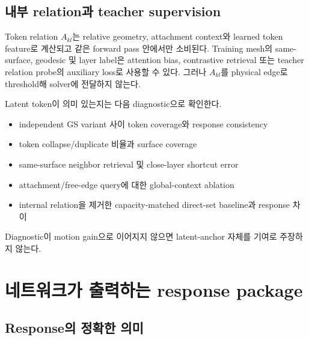\documentclass[11pt]{article}
\begin{document}
\subsection{내부 relation과 teacher supervision}

Token relation \(A_{kl}\)는 relative geometry, attachment context와 learned token feature로 계산되고
같은 forward pass 안에서만 소비된다.
Training mesh의 same-surface, geodesic 및 layer label은 attention bias, contrastive retrieval 또는
teacher relation probe의 auxiliary loss로 사용할 수 있다. 그러나 \(A_{kl}\)를 physical edge로 threshold해
solver에 전달하지 않는다.

Latent token이 의미 있는지는 다음 diagnostic으로 확인한다.
\begin{itemize}
  \item independent GS variant 사이 token coverage와 response consistency
  \item token collapse/duplicate 비율과 surface coverage
  \item same-surface neighbor retrieval 및 close-layer shortcut error
  \item attachment/free-edge query에 대한 global-context ablation
  \item internal relation을 제거한 capacity-matched direct-set baseline과 response 차이
\end{itemize}
Diagnostic이 motion gain으로 이어지지 않으면 latent-anchor 자체를 기여로 주장하지 않는다.

\section{네트워크가 출력하는 response package}

\subsection{Response의 정확한 의미}
\end{document}
